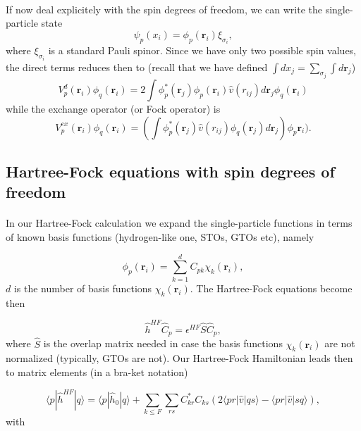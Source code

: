 \documentclass[%
twoside,                 %
final,                   %
10pt]{article}
\begin{document}
\paragraph{}
If now deal explicitely with the spin degrees of freedom, we can write the single-particle state
\[
\psi_{p}(x_i) = \phi_{p}(\mathbf{r}_i)\xi_{\sigma_i},
\]
where $\xi_{\sigma_i}$ is a standard Pauli spinor. Since we have only two possible spin values, the direct terms reduces then to
(recall that we have defined $\int dx_j = \sum_{\sigma_j} \int d \mathbf{r}_j$)
\[
  V_{p}^{d}(\mathbf{r}_i)\phi_{q}(\mathbf{r}_i) = 2\int \phi_{p}^*(\mathbf{r}_j)\phi_{p}(\mathbf{r}_i)\hat{v}(r_{ij}) d\mathbf{r}_j\phi_{q}(\mathbf{r}_i)
\]
while the exchange operator (or Fock operator) is
\[
  V_{p}^{ex}(\mathbf{r}_i) \phi_{q}(\mathbf{r}_i) = \left(\int \phi_{p}^*(\mathbf{r}_j) 
  \hat{v}(r_{ij})\phi_{q}(\mathbf{r}_j)
  d\mathbf{r}_j\right)\phi_{p}\mathbf{r}_i).
\]



\subsection*{Hartree-Fock equations with spin degrees of freedom}

\paragraph{}

In our Hartree-Fock calculation we expand the single-particle functions in terms of known basis functions (hydrogen-like one, STOs, GTOs etc), namely

\begin{equation*}
\phi_{p}(\mathbf{r}_i) = \sum_{k=1}^{d}C_{pk}\chi_k(\mathbf{r}_i),
\end{equation*}
$d$ is the number of basis functions $\chi_k(\mathbf{r}_i)$. The Hartree-Fock equations become then

\begin{equation*}
\hat{h}^{HF}\hat{C}_p=\epsilon^{HF}\hat{S}\hat{C}_p,
\end{equation*}
where $\hat{S}$ is the overlap matrix needed in case the basis functions $\chi_k(\mathbf{r}_i)$ are not normalized (typically, GTOs are not). 
Our Hartree-Fock Hamiltonian leads then to matrix elements (in a bra-ket notation)

\[
\langle p | \hat{h}^{HF} | q \rangle = \langle p|\hat{h}_0|q\rangle +\sum_{k\le F}\sum_{rs}C_{kr}^*C_{ks}\left(2\langle pr | \hat{v}|qs\rangle-\langle pr | \hat{v}|sq\rangle\right),
\]
with
\end{document}
